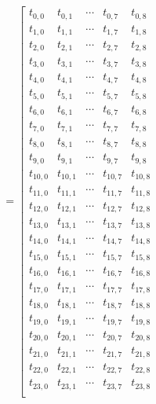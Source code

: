 \documentclass{article}
\begin{document}
\begin{align}
    \nonumber
    \\
    &=\left[
    \begin{matrix}
        t_{0,0}  & t_{0,1}  & \cdots & t_{0,7}  & t_{0,8}  \\
        t_{1,0}  & t_{1,1}  & \cdots & t_{1,7}  & t_{1,8}  \\
        t_{2,0}  & t_{2,1}  & \cdots & t_{2,7}  & t_{2,8}  \\
        t_{3,0}  & t_{3,1}  & \cdots & t_{3,7}  & t_{3,8}  \\
        t_{4,0}  & t_{4,1}  & \cdots & t_{4,7}  & t_{4,8}  \\
        t_{5,0}  & t_{5,1}  & \cdots & t_{5,7}  & t_{5,8}  \\
        t_{6,0}  & t_{6,1}  & \cdots & t_{6,7}  & t_{6,8}  \\
        t_{7,0}  & t_{7,1}  & \cdots & t_{7,7}  & t_{7,8}  \\
        t_{8,0}  & t_{8,1}  & \cdots & t_{8,7}  & t_{8,8}  \\
        t_{9,0}  & t_{9,1}  & \cdots & t_{9,7}  & t_{9,8}  \\
        t_{10,0} & t_{10,1} & \cdots & t_{10,7} & t_{10,8} \\
        t_{11,0} & t_{11,1} & \cdots & t_{11,7} & t_{11,8} \\
        t_{12,0} & t_{12,1} & \cdots & t_{12,7} & t_{12,8} \\
        t_{13,0} & t_{13,1} & \cdots & t_{13,7} & t_{13,8} \\
        t_{14,0} & t_{14,1} & \cdots & t_{14,7} & t_{14,8} \\
        t_{15,0} & t_{15,1} & \cdots & t_{15,7} & t_{15,8} \\
        t_{16,0} & t_{16,1} & \cdots & t_{16,7} & t_{16,8} \\
        t_{17,0} & t_{17,1} & \cdots & t_{17,7} & t_{17,8} \\
        t_{18,0} & t_{18,1} & \cdots & t_{18,7} & t_{18,8} \\
        t_{19,0} & t_{19,1} & \cdots & t_{19,7} & t_{19,8} \\
        t_{20,0} & t_{20,1} & \cdots & t_{20,7} & t_{20,8} \\
        t_{21,0} & t_{21,1} & \cdots & t_{21,7} & t_{21,8} \\
        t_{22,0} & t_{22,1} & \cdots & t_{22,7} & t_{22,8} \\
        t_{23,0} & t_{23,1} & \cdots & t_{23,7} & t_{23,8} \\
    \end{matrix}

\end{align}
\end{document}
